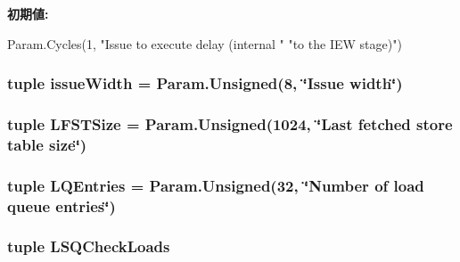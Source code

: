 \label{classO3CPU_1_1DerivO3CPU_ab445ea6366a58d7753b058bd794548a8}
{\bfseries 初期値:}
\begin{DoxyCode}
Param.Cycles(1, "Issue to execute delay (internal "
              "to the IEW stage)")
\end{DoxyCode}
\hypertarget{classO3CPU_1_1DerivO3CPU_a1e02adcb8a1e64fc82f4b389844d2f68}{
\subsubsection[{issueWidth}]{\setlength{\rightskip}{0pt plus 5cm}tuple {\bf issueWidth} = Param.Unsigned(8, \char`\"{}Issue width\char`\"{})}}
\label{classO3CPU_1_1DerivO3CPU_a1e02adcb8a1e64fc82f4b389844d2f68}
\hypertarget{classO3CPU_1_1DerivO3CPU_ae8cdf1f1e20a08d0b3200297a9da7d60}{
\subsubsection[{LFSTSize}]{\setlength{\rightskip}{0pt plus 5cm}tuple {\bf LFSTSize} = Param.Unsigned(1024, \char`\"{}Last fetched store table size\char`\"{})}}
\label{classO3CPU_1_1DerivO3CPU_ae8cdf1f1e20a08d0b3200297a9da7d60}
\hypertarget{classO3CPU_1_1DerivO3CPU_ae14ed73e842c3580d021c73c0e2b5aaf}{
\subsubsection[{LQEntries}]{\setlength{\rightskip}{0pt plus 5cm}tuple {\bf LQEntries} = Param.Unsigned(32, \char`\"{}Number of load queue entries\char`\"{})}}
\label{classO3CPU_1_1DerivO3CPU_ae14ed73e842c3580d021c73c0e2b5aaf}
\hypertarget{classO3CPU_1_1DerivO3CPU_a3859ad14dd72838e8cd3c5586a575f39}{
\subsubsection[{LSQCheckLoads}]{\setlength{\rightskip}{0pt plus 5cm}tuple {\bf LSQCheckLoads}}}
